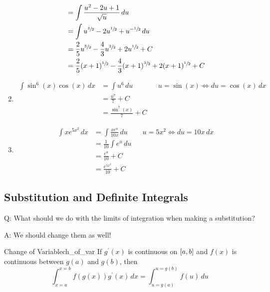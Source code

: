 \begin{Example}{}{}
\begin{enumerate}[label=(\roman*)]
\begin{align*}
                   & =\int \frac{u^2-2u+1}{\sqrt{u}} \, d{u}                                                                         \\
                   & =\int u^{\sfrac{3}{2}}-2u^{\sfrac{1}{2}}+u^{-\sfrac{1}{2}}\, d{u}                                               \\
                   & =\frac{2}{5} u^{\sfrac{5}{2} }-\frac{4}{3}u^{\sfrac{3}{2}}+2u^{\sfrac{1}{2}}+C                                  \\
                   & =\frac{2}{5} (x+1)^{\sfrac{5}{2} }-\frac{4}{3}(x+1)^{\sfrac{3}{2}}+2(x+1)^{\sfrac{1}{2}}+C
              \end{align*}
        \item \begin{align*}
                  \int \sin^6(x)\cos(x)\, d{x}
                   & =\int u^6\, d{u}        &  & u=\sin(x)\iff du=\cos(x)\,dx \\
                   & =\frac{u^7}{7}+C                                          \\
                   & =\frac{\sin^7(x)}{7} +C
              \end{align*}
        \item \begin{align*}
                  \int x e^{5x^2}\, d{x}
                   & =\int \frac{xe^u}{10x} \, d{u} &  & u=5x^2\iff du=10x\,dx \\
                   & =\frac{1}{10} \int e^u\, d{u}                             \\
                   & =\frac{e^u}{10} +C                                        \\
                   & =\frac{e^{5x^2}}{10} +C
              \end{align*}
    \end{enumerate}
\end{Example}

\subsection{Substitution and Definite Integrals}
Q\@: What should we do with the limits of integration when making a substitution?

A\@: We should change them as well!

\begin{Theorem}{Change of Variable}{ch_of_var}
    If $ g^\prime(x) $ is continuous on $ \interval{a}{b} $ and $ f(x) $
    is continuous between $ g(a) $ and $ g(b) $, then
    \[ \int_{x=a}^{x=b} f(g(x))g^\prime(x)\, d{x} =
        \int_{u=g(a)}^{u=g(b)} f(u)\, d{u}  \]
\end{Theorem}

